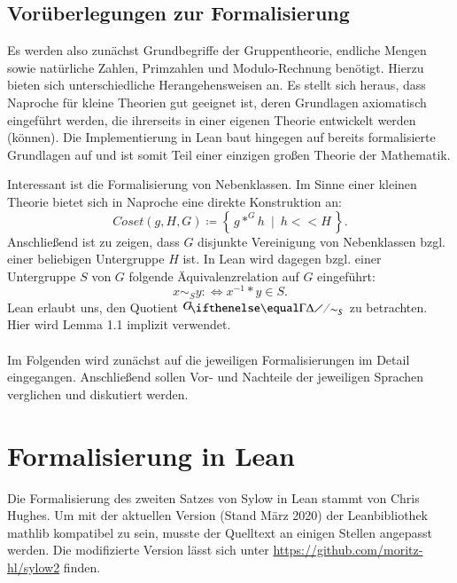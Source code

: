 \documentclass[a4paper,12pt]{scrartcl}
\newcommand{\st}{\ \mid\ }
\begin{document}
\subsection{Vorüberlegungen zur Formalisierung}
Es werden also zunächst Grundbegriffe der Gruppentheorie, endliche Mengen sowie natürliche Zahlen, Primzahlen und Modulo-Rechnung benötigt. Hierzu bieten sich unterschiedliche Herangehensweisen an. 
Es stellt sich heraus, dass Naproche für kleine Theorien gut geeignet ist, deren Grundlagen axiomatisch eingeführt werden, die ihrerseits in einer eigenen Theorie entwickelt werden (können). Die Implementierung in Lean baut hingegen auf bereits formalisierte Grundlagen auf und ist somit Teil einer einzigen großen Theorie der Mathematik. 

Interessant ist die Formalisierung von Nebenklassen. Im Sinne einer kleinen Theorie bietet sich in Naproche eine direkte Konstruktion an: $$Coset\left(g, H, G\right) \coloneqq \left\{\,g *^{G} h \st h << H\,\right\}.$$ Anschließend ist zu zeigen, dass $G$ disjunkte Vereinigung von Nebenklassen bzgl. einer beliebigen Untergruppe $H$ ist.
In Lean wird dagegen bzgl. einer Untergruppe $S$ von $G$ folgende Äquivalenzrelation auf $G$ eingeführt: $$x\sim_{S} y :\Leftrightarrow x^{-1}*y\in S.$$
Lean erlaubt uns, den Quotient $\fkr{G}{\sim_{S}}[-0.2]$ zu betrachten. Hier wird Lemma 1.1 implizit verwendet.
\paragraph*{}
Im Folgenden wird zunächst auf die jeweiligen Formalisierungen im Detail eingegangen. Anschließend sollen Vor- und Nachteile der jeweiligen Sprachen verglichen und diskutiert werden.


\newpage
\section{Formalisierung in Lean}

Die Formalisierung des zweiten Satzes von Sylow in Lean stammt von Chris Hughes\cite{bibtex.c}.
Um mit der aktuellen Version (Stand März 2020) der Leanbibliothek mathlib \cite{bibtex.d} kompatibel zu sein, musste der Quelltext an einigen Stellen angepasst werden. Die modifizierte Version lässt sich unter \url{https://github.com/moritz-hl/sylow2} finden.
\end{document}
